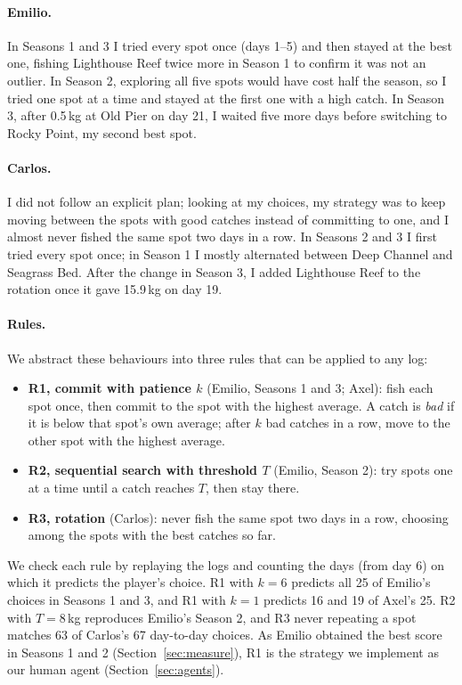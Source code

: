 \documentclass[11pt,a4paper]{article}
\begin{document}
\paragraph{Emilio.} In Seasons 1 and 3 I tried every spot once (days 1--5) and
then stayed at the best one, fishing Lighthouse Reef twice more in Season 1 to
confirm it was not an outlier. In Season 2, exploring all five spots would have
cost half the season, so I tried one spot at a time and stayed at the first one
with a high catch. In Season 3, after 0.5\,kg at Old Pier on day 21, I waited
five more days before switching to Rocky Point, my second best spot.

\paragraph{Carlos.} I did not follow an explicit plan; looking at my choices, my
strategy was to keep moving between the spots with good catches instead of
committing to one, and I almost never fished the same spot two days in a row.
In Seasons 2 and 3 I first tried every spot once; in Season 1 I mostly
alternated between Deep Channel and Seagrass Bed. After the change in Season 3,
I added Lighthouse Reef to the rotation once it gave 15.9\,kg on day 19.

\paragraph{Rules.} We abstract these behaviours into three rules that can be
applied to any log:
\begin{itemize}
  \item \textbf{R1, commit with patience $k$} (Emilio, Seasons 1 and 3; Axel):
  fish each spot once, then commit to the spot with the highest average. A catch
  is \emph{bad} if it is below that spot's own average; after $k$ bad catches in
  a row, move to the other spot with the highest average.
  \item \textbf{R2, sequential search with threshold $T$} (Emilio, Season 2):
  try spots one at a time until a catch reaches $T$, then stay there.
  \item \textbf{R3, rotation} (Carlos): never fish the same spot two days in a
  row, choosing among the spots with the best catches so far.
\end{itemize}

We check each rule by replaying the logs and counting the days (from day 6) on
which it predicts the player's choice. R1 with $k=6$ predicts all 25 of Emilio's
choices in Seasons 1 and 3, and R1 with $k=1$ predicts 16 and 19 of Axel's 25.
R2 with $T=8$\,kg reproduces Emilio's Season 2, and R3 never repeating a spot
matches 63 of Carlos's 67 day-to-day choices. As Emilio obtained the best score
in Seasons 1 and 2 (Section~\ref{sec:measure}), R1 is the strategy we implement
as our human agent (Section~\ref{sec:agents}).
\end{document}
